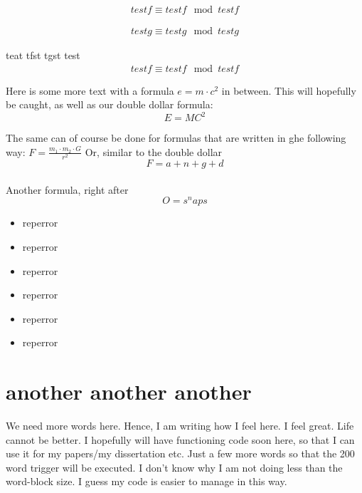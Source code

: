 
\begin{eqnarray*}
testf \equiv testf \mod testf
\end{eqnarray*}

\begin{eqnarray}
testg \equiv testg \mod testg
\end{eqnarray}

teat tfst tgst test
\begin{eqnarray*}
testf \equiv testf \mod testf
\end{eqnarray*}

Here is some more text with a formula $e=m\cdot c^2$ in between. This
will hopefully be caught, as well as our double dollar formula:
$$E=MC^2$$

The same can of course be done for formulas that are written in ghe
following way: \(F = \frac{m_1 \cdot m_2 \cdot G}{r^2}\)
Or, similar to the double dollar
\[F = a + n + g + d\]\\[12pt]

Another formula, right after
\[O=s^naps\]

\begin{itemize}
\item reperror
\item reperror
\item reperror
\item reperror
\item reperror
\item reperror
\end{itemize}

\section{another another another}

\setlength{35}

We need more words here. Hence, I am writing how I feel here. I feel
great. Life cannot be better. I hopefully will have functioning code
soon here, so that I can use it for my papers/my dissertation
etc. Just a few more words so that the 200 word trigger will be
executed.
I don't know why I am not doing less than the word-block size. I guess
my code is easier to manage in this way.

